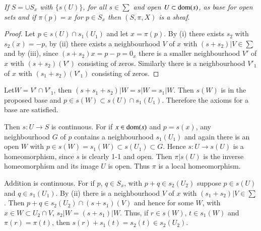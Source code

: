 \textit{If $S = \cup S_x$ with $\{s(U) \}$, for all $s \in \sum$ and
  open $U \subset \operatorname{dom} (s)$, as base for open sets and if $\pi(p) = x$
  for $p \in S_x$ then $(S,\pi,X)$ is a sheaf}. 

\begin{proof}
Let $p  \in  s(U) \cap s_1 (U_1)$ and let $x = \pi (p)$. By (i)
there exists $s_2$ with $s_2(x) = -p$, by (ii) there exists a
neighbourhood $V$ of $x$ with $(s + s_2)  | V \in \sum$ and by
(iii), since $(s + s_2)x = p -p = 0_x$ there is a smaller
neighbourhood $V'$ of $x$ with $(s + s_2) (V')$ consisting of
zeros. Similarly there is a neighbourhood $V'_1$ of $x$ with $(s_1 +
s_2) (V'_1)$ consisting of zeros. 
\end{proof}

\noindent
Let\pageoriginale $W = V' \cap V'_1$, then $(s + s_1 + s_2)  | W = s  |  W  =
s_1  | W$. Then $s(W)$ is in the proposed base and $p \in s(W)
\subset s(U) \cap s_1(U_1)$. Therefore the axioms for a base are
satisfied. 

Then $s : U \rightarrow S$ is continuous. For if $x \in \operatorname{dom} (s)$ and
$p = s(x)$, any neighbourhood $G$ of $p$ contains a neighbourhood $s_1
(U_1)$ and again there is an open $W$ with $p \in s(W) = s_1(W)
\subset s(U_1) \subset G$. Hence $s : U \rightarrow s(U)$ is a
homeomorphism, since $s$ is clearly 1-1 and open. Then $\pi  |
s(U)$ is the inverse homeomorphism and its image $U$ is open. Thus
$\pi$ is a local homeomorphism. 

Addition is continuous. For if $p$, $q \in S_x$, with $p + q \in
s_2(U_2)$ suppose $p \in s(U)$ and $q \in s_1(U_1)$. By (ii) there
is a neighbourhood $V$ of $x$ with $(s_1 + s_2)  | V \in
\sum$. Then $p + q \in s_2 (U_2) \cap (s + s_1) (V)$ and hence for
some $W$, with $x \in W \subset U_2 \cap V$, $s_2  |  W = (s + s_1) 
|  W$. Thus, if $ r \in s (W)$, $t \in s_1 (W)$ and $\pi (r) = \pi
(t)$, then $s(r) + s_1(t) = s_2(t) \in s_2(U_2)$. 

